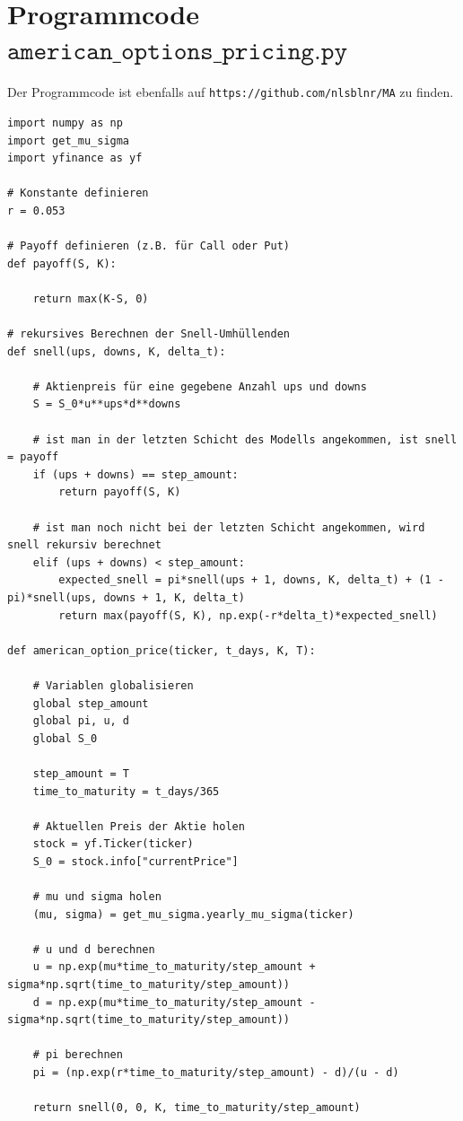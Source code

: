 \documentclass[11pt]{report} %
\begin{document}
\section{Programmcode $\texttt{american\_options\_pricing.py}$}
Der Programmcode ist ebenfalls auf \texttt{https://github.com/nlsblnr/MA} zu finden.
\label{code:american_options_pricing.py}
\begin{lstlisting}
import numpy as np
import get_mu_sigma
import yfinance as yf

# Konstante definieren
r = 0.053

# Payoff definieren (z.B. für Call oder Put)
def payoff(S, K):

    return max(K-S, 0)

# rekursives Berechnen der Snell-Umhüllenden
def snell(ups, downs, K, delta_t):
    
    # Aktienpreis für eine gegebene Anzahl ups und downs
    S = S_0*u**ups*d**downs

    # ist man in der letzten Schicht des Modells angekommen, ist snell = payoff
    if (ups + downs) == step_amount:
        return payoff(S, K)
    
    # ist man noch nicht bei der letzten Schicht angekommen, wird snell rekursiv berechnet
    elif (ups + downs) < step_amount:
        expected_snell = pi*snell(ups + 1, downs, K, delta_t) + (1 - pi)*snell(ups, downs + 1, K, delta_t)
        return max(payoff(S, K), np.exp(-r*delta_t)*expected_snell)

def american_option_price(ticker, t_days, K, T):

    # Variablen globalisieren
    global step_amount
    global pi, u, d
    global S_0

    step_amount = T 
    time_to_maturity = t_days/365

    # Aktuellen Preis der Aktie holen
    stock = yf.Ticker(ticker)
    S_0 = stock.info["currentPrice"]

    # mu und sigma holen
    (mu, sigma) = get_mu_sigma.yearly_mu_sigma(ticker)

    # u und d berechnen
    u = np.exp(mu*time_to_maturity/step_amount + sigma*np.sqrt(time_to_maturity/step_amount))
    d = np.exp(mu*time_to_maturity/step_amount - sigma*np.sqrt(time_to_maturity/step_amount))

    # pi berechnen
    pi = (np.exp(r*time_to_maturity/step_amount) - d)/(u - d)

    return snell(0, 0, K, time_to_maturity/step_amount)

\end{lstlisting}
\end{document}
